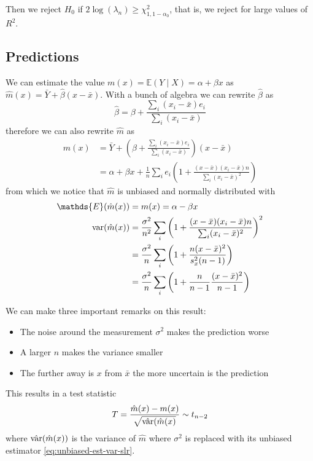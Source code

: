 \documentclass[12pt]{extarticle}
\renewcommand{\var}{{\operatorfont var}}
\newcommand{\E}{\mathds{E}}
\begin{document}
Then we reject $H_0$ if $2\log(\lambda_n) \geq \chi^2_{1, 1-\alpha_0}$,
that is, we reject for large values of $R^2$.

\subsection{Predictions}

We can estimate the value $m(x) = \E(Y \mid X) = \alpha + \beta x$
as $\hat m(x) = \bar Y + \hat \beta (x - \bar x)$.
With a bunch of algebra we can rewrite $\hat \beta$ as
\begin{equation}
    \hat \beta = \beta +  \frac{\sum_i (x_i - \bar x) e_i}{\sum_i (x_i - \bar x)}
\end{equation}
therefore we can also rewrite $\hat m$ as
\begin{align}
    \hat m(x) & = \bar Y + \left(\beta +  \frac{\sum_i (x_i - \bar x) e_i}{\sum_i (x_i - \bar x)}\right) (x - \bar x)   \\
              & = \alpha + \beta x + \frac{1}{n} \sum_i e_i(1+\frac{(x-\bar x)(x_i - \bar x) n}{\sum_i (x_i-\bar x)^2})
\end{align}
from which we notice that $\hat m$ is unbiased and normally distributed with
\begin{align}
    \E(\hat m(x))   & = m(x) = \alpha - \beta x                                                                                 \\
    \var(\hat m(x)) & = \frac{\sigma^2}{n^2} \sum_i \left( 1+ \frac{(x-\bar x)(x_i - \bar x) n}{\sum_i (x_i-\bar x)^2}\right)^2 \\
                    & = \frac{\sigma^2}{n} \sum_i \left( 1 + \frac{n(x-\bar x)^2}{s_x^2(n-1)}\right)                            \\
                    & = \frac{\sigma^2}{n} \sum_i \left( 1 + \frac{n}{n-1} \frac{(x-\bar x)^2}{n-1}\right)
\end{align}

We can make three important remarks on this result:
\begin{itemize}
    \item The noise around the measurement $\sigma^2$ makes the prediction worse
    \item A larger $n$ makes the variance smaller
    \item The further away is $x$ from $\bar x$ the more uncertain is the prediction
\end{itemize}

This results in a test statistic
\begin{equation}
    T = \frac{\hat m(x) - m(x)}{\sqrt{\hat{\var}(\hat m(x)}} \sim t_{n-2}
\end{equation}
where $\hat{\var}(\hat m(x))$ is the variance of $\hat m$ where $\sigma^2$ is replaced with its unbiased
estimator \cref{eq:unbiased-est-var-slr}.
\end{document}
